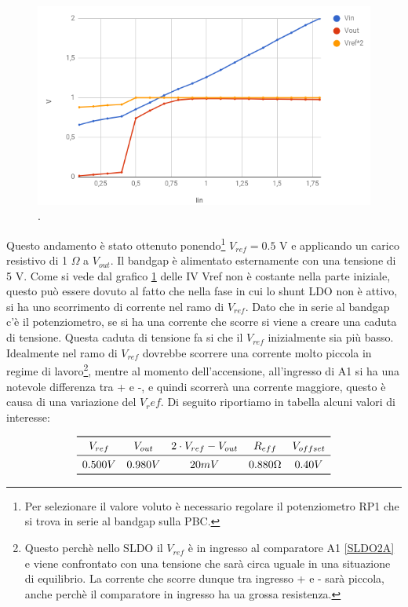 \begin{figure}
\centering
\includegraphics[scale=.5]{Immagini/SLDO2Astatic}
\caption{.}
\label{SLDO2Astatic}
\end{figure}

Questo andamento è stato ottenuto ponendo\footnote{Per selezionare il valore voluto è necessario regolare il potenziometro RP1 che si trova in serie al bandgap sulla PBC.} $V_{ref} = 0.5$ V e applicando un carico resistivo di 1 $\Omega$ a $V_{out}$. Il bandgap è alimentato esternamente con una tensione di 5 V. 
Come si vede dal grafico \ref{SLDO2Astatic} delle IV Vref non è costante nella parte iniziale, questo può essere dovuto al fatto che nella fase in cui lo shunt LDO non è attivo, si ha uno scorrimento di corrente nel ramo di $V_{ref}$. Dato che in serie al bandgap c'è il potenziometro, se si ha una corrente che scorre si viene a creare una caduta di tensione. Questa caduta di tensione fa si che il $V_{ref}$ inizialmente sia più basso. Idealmente nel ramo di $V_{ref}$ dovrebbe scorrere una corrente molto piccola in regime di lavoro\footnote{Questo perchè nello SLDO il $V_{ref}$ è in ingresso al comparatore A1 \ref{SLDO2A} e viene confrontato con una tensione che sarà circa uguale in una situazione di equilibrio. La corrente che scorre dunque tra ingresso + e - sarà piccola, anche perchè il comparatore in ingresso ha ua grossa resistenza.}, mentre al momento dell'accensione, all'ingresso di A1 si ha una notevole differenza tra + e -, e quindi scorrerà una corrente maggiore, questo è causa di una variazione del $V_ref$. Di seguito riportiamo in tabella alcuni valori di interesse: 

\[
\begin{array}{ccccc}

\toprule
V_{ref} & V_{out} & 2 \cdot V_{ref}- V_{out} & R_{eff} & V_{offset} \\

\midrule

0.500 V & 0.980 V & 20 mV & 0.880 \Omega & 0.40 V \\

\bottomrule
\end{array}
\]


